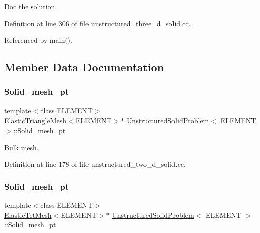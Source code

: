 Doc the solution. 



Definition at line 306 of file unstructured\+\_\+three\+\_\+d\+\_\+solid.\+cc.



Referenced by main().



\subsection{Member Data Documentation}
\mbox{\label{classUnstructuredSolidProblem_a2645c5bde2b09a78ae00ef2dcd07411b}} 
\subsubsection{\texorpdfstring{Solid\+\_\+mesh\+\_\+pt}{Solid\_mesh\_pt}\hspace{0.1cm}{\footnotesize\ttfamily [1/2]}}
{\footnotesize\ttfamily template$<$class E\+L\+E\+M\+E\+NT$>$ \\
\hyperlink{classElasticTriangleMesh}{Elastic\+Triangle\+Mesh}$<$E\+L\+E\+M\+E\+NT$>$$\ast$ \hyperlink{classUnstructuredSolidProblem}{Unstructured\+Solid\+Problem}$<$ E\+L\+E\+M\+E\+NT $>$\+::Solid\+\_\+mesh\+\_\+pt\hspace{0.3cm}{\ttfamily [private]}}



Bulk mesh. 



Definition at line 178 of file unstructured\+\_\+two\+\_\+d\+\_\+solid.\+cc.

\mbox{\label{classUnstructuredSolidProblem_a09c0a07feb1586f2cca3766b4ac92099}} 
\subsubsection{\texorpdfstring{Solid\+\_\+mesh\+\_\+pt}{Solid\_mesh\_pt}\hspace{0.1cm}{\footnotesize\ttfamily [2/2]}}
{\footnotesize\ttfamily template$<$class E\+L\+E\+M\+E\+NT$>$ \\
\hyperlink{classElasticTetMesh}{Elastic\+Tet\+Mesh}$<$E\+L\+E\+M\+E\+NT$>$$\ast$ \hyperlink{classUnstructuredSolidProblem}{Unstructured\+Solid\+Problem}$<$ E\+L\+E\+M\+E\+NT $>$\+::Solid\+\_\+mesh\+\_\+pt\hspace{0.3cm}{\ttfamily [private]}}



